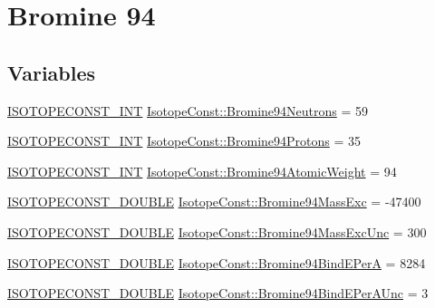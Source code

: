 \hypertarget{group___isotope_const-_bromine-_br94}{}\section{Bromine 94}
\label{group___isotope_const-_bromine-_br94}
\subsection*{Variables}
\begin{DoxyCompactItemize}
\item 
\mbox{\hyperlink{group___isotope_const-_macros_ga5f18360b3e99483a35c32d789e62621c}{I\+S\+O\+T\+O\+P\+E\+C\+O\+N\+S\+T\+\_\+\+I\+NT}} \mbox{\hyperlink{group___isotope_const-_bromine-_br94_ga29408dc0a27cee82cabc5690a5eff371}{Isotope\+Const\+::\+Bromine94\+Neutrons}} = 59
\item 
\mbox{\hyperlink{group___isotope_const-_macros_ga5f18360b3e99483a35c32d789e62621c}{I\+S\+O\+T\+O\+P\+E\+C\+O\+N\+S\+T\+\_\+\+I\+NT}} \mbox{\hyperlink{group___isotope_const-_bromine-_br94_gadeed23a9516cc03999644e0c0441b16b}{Isotope\+Const\+::\+Bromine94\+Protons}} = 35
\item 
\mbox{\hyperlink{group___isotope_const-_macros_ga5f18360b3e99483a35c32d789e62621c}{I\+S\+O\+T\+O\+P\+E\+C\+O\+N\+S\+T\+\_\+\+I\+NT}} \mbox{\hyperlink{group___isotope_const-_bromine-_br94_gafd73235a2487275c5ab549c643838c25}{Isotope\+Const\+::\+Bromine94\+Atomic\+Weight}} = 94
\item 
\mbox{\hyperlink{group___isotope_const-_macros_ga8f45a7272ce02c0b4c65c44636ed719a}{I\+S\+O\+T\+O\+P\+E\+C\+O\+N\+S\+T\+\_\+\+D\+O\+U\+B\+LE}} \mbox{\hyperlink{group___isotope_const-_bromine-_br94_ga254e75a6583eb3d11d4a500a9435ebe6}{Isotope\+Const\+::\+Bromine94\+Mass\+Exc}} = -\/47400
\item 
\mbox{\hyperlink{group___isotope_const-_macros_ga8f45a7272ce02c0b4c65c44636ed719a}{I\+S\+O\+T\+O\+P\+E\+C\+O\+N\+S\+T\+\_\+\+D\+O\+U\+B\+LE}} \mbox{\hyperlink{group___isotope_const-_bromine-_br94_ga99201f96b334eed091155badc84f2a5c}{Isotope\+Const\+::\+Bromine94\+Mass\+Exc\+Unc}} = 300
\item 
\mbox{\hyperlink{group___isotope_const-_macros_ga8f45a7272ce02c0b4c65c44636ed719a}{I\+S\+O\+T\+O\+P\+E\+C\+O\+N\+S\+T\+\_\+\+D\+O\+U\+B\+LE}} \mbox{\hyperlink{group___isotope_const-_bromine-_br94_gad91383078b2e0f95baba882cf2662e21}{Isotope\+Const\+::\+Bromine94\+Bind\+E\+PerA}} = 8284
\item 
\mbox{\hyperlink{group___isotope_const-_macros_ga8f45a7272ce02c0b4c65c44636ed719a}{I\+S\+O\+T\+O\+P\+E\+C\+O\+N\+S\+T\+\_\+\+D\+O\+U\+B\+LE}} \mbox{\hyperlink{group___isotope_const-_bromine-_br94_ga727dad19e61df6fedd715d23715f8c75}{Isotope\+Const\+::\+Bromine94\+Bind\+E\+Per\+A\+Unc}} = 3

\end{DoxyCompactItemize}
